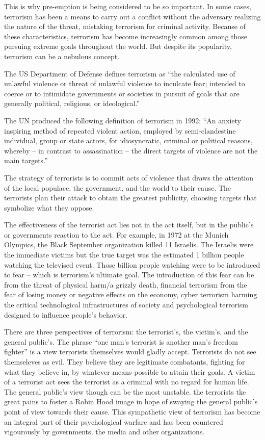 \documentclass[
  openany]{book}
\begin{document}
This is why pre-emption is being considered to be so important. In some cases, terrorism has been a means to carry out a conflict without the adversary realizing the nature of the threat, mistaking terrorism for criminal activity. Because of these characteristics, terrorism has become increasingly common among those pursuing extreme goals throughout the world. But despite its popularity, terrorism can be a nebulous concept.

The US Department of Defense defines terrorism as ``the calculated use of unlawful violence or threat of unlawful violence to inculcate fear; intended to coerce or to intimidate governments or societies in pursuit of goals that are generally political, religious, or ideological.''

The UN produced the following definition of terrorism in 1992; ``An anxiety inspiring method of repeated violent action, employed by semi-clandestine individual, group or state actors, for idiosyncratic, criminal or political reasons, whereby -- in contrast to assassination -- the direct targets of violence are not the main targets.''

The strategy of terrorists is to commit acts of violence that draws the attention of the local populace, the government, and the world to their cause. The terrorists plan their attack to obtain the greatest publicity, choosing targets that symbolize what they oppose.

The effectiveness of the terrorist act lies not in the act itself, but in the public's or governments reaction to the act. For example, in 1972 at the Munich Olympics, the Black September organization killed 11 Israelis. The Israelis were the immediate victims but the true target was the estimated 1 billion people watching the televised event. Those billion people watching were to be introduced to fear -- which is terrorism's ultimate goal. The introduction of this fear can be from the threat of physical harm/a grizzly death, financial terrorism from the fear of losing money or negative effects on the economy, cyber terrorism harming the critical technological infrastructures of society and psychological terrorism designed to influence people's behavior.

There are three perspectives of terrorism: the terrorist's, the victim's, and the general public's. The phrase ``one man's terrorist is another man's freedom fighter'' is a view terrorists themselves would gladly accept. Terrorists do not see themseleves as evil. They believe they are legitimate combatants, fighting for what they believe in, by whatever means possible to attain their goals. A victim of a terrorist act sees the terrorist as a criminal with no regard for human life. The general public's view though can be the most unstable. the terrorists tke great pains to foster a Robin Hood image in hope of swaying the general public's point of view towards their cause. This sympathetic view of terrorism has become an integral part of their psychological warfare and has been countered vigourously by governments, the media and other organizations.
\end{document}

